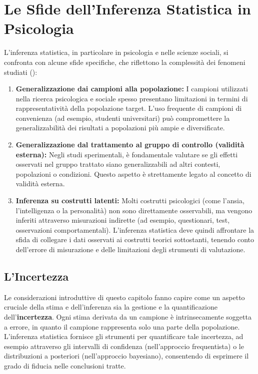 \documentclass[
  letterpaper,
]{krantz}
\begin{document}
\section{Le Sfide dell'Inferenza Statistica in
Psicologia}\label{le-sfide-dellinferenza-statistica-in-psicologia}

L'inferenza statistica, in particolare in psicologia e nelle scienze
sociali, si confronta con alcune sfide specifiche, che riflettono la
complessità dei fenomeni studiati
():

\begin{enumerate}
\def\labelenumi{\arabic{enumi}.}
\item
  \textbf{Generalizzazione dai campioni alla popolazione:} I campioni
  utilizzati nella ricerca psicologica e sociale spesso presentano
  limitazioni in termini di rappresentatività della popolazione target.
  L'uso frequente di campioni di convenienza (ad esempio, studenti
  universitari) può compromettere la generalizzabilità dei risultati a
  popolazioni più ampie e diversificate.
\item
  \textbf{Generalizzazione dal trattamento al gruppo di controllo
  (validità esterna):} Negli studi sperimentali, è fondamentale valutare
  se gli effetti osservati nel gruppo trattato siano generalizzabili ad
  altri contesti, popolazioni o condizioni. Questo aspetto è
  strettamente legato al concetto di validità esterna.
\item
  \textbf{Inferenza su costrutti latenti:} Molti costrutti psicologici
  (come l'ansia, l'intelligenza o la personalità) non sono direttamente
  osservabili, ma vengono inferiti attraverso misurazioni indirette (ad
  esempio, questionari, test, osservazioni comportamentali). L'inferenza
  statistica deve quindi affrontare la sfida di collegare i dati
  osservati ai costrutti teorici sottostanti, tenendo conto dell'errore
  di misurazione e delle limitazioni degli strumenti di valutazione.
\end{enumerate}

\subsection{L'Incertezza}\label{lincertezza}

Le considerazioni introduttive di questo capitolo fanno capire come un
aspetto cruciale della stima e dell'inferenza sia la gestione e la
quantificazione dell'\textbf{incertezza}. Ogni stima derivata da un
campione è intrinsecamente soggetta a errore, in quanto il campione
rappresenta solo una parte della popolazione. L'inferenza statistica
fornisce gli strumenti per quantificare tale incertezza, ad esempio
attraverso gli intervalli di confidenza (nell'approccio frequentista) o
le distribuzioni a posteriori (nell'approccio bayesiano), consentendo di
esprimere il grado di fiducia nelle conclusioni tratte.
\end{document}
